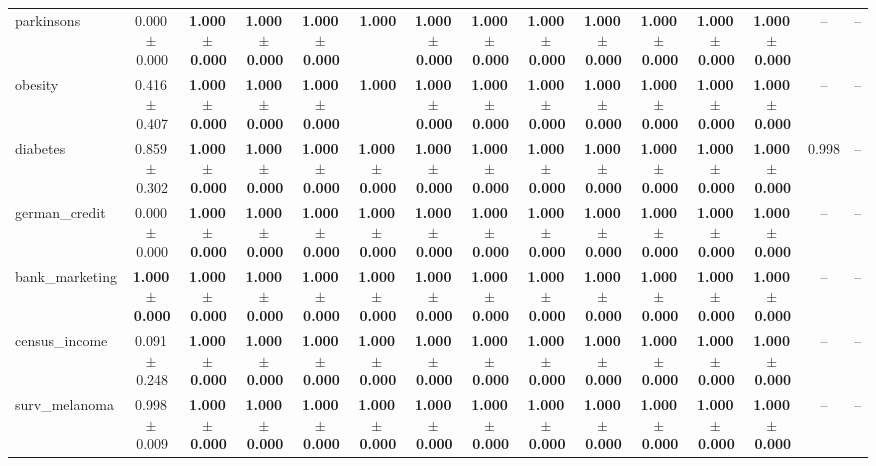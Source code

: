 \documentclass[8pt]{extarticle}
\begin{document}
\begin{longtable}{l*{14}{c}}
parkinsons & 0.000\,$\pm$\,0.000 & \textbf{1.000\,$\pm$\,0.000} & \textbf{1.000\,$\pm$\,0.000} & \textbf{1.000\,$\pm$\,0.000} & \textbf{1.000} & \textbf{1.000\,$\pm$\,0.000} & \textbf{1.000\,$\pm$\,0.000} & \textbf{1.000\,$\pm$\,0.000} & \textbf{1.000\,$\pm$\,0.000} & \textbf{1.000\,$\pm$\,0.000} & \textbf{1.000\,$\pm$\,0.000} & \textbf{1.000\,$\pm$\,0.000} & -- & -- \\
obesity & 0.416\,$\pm$\,0.407 & \textbf{1.000\,$\pm$\,0.000} & \textbf{1.000\,$\pm$\,0.000} & \textbf{1.000\,$\pm$\,0.000} & \textbf{1.000} & \textbf{1.000\,$\pm$\,0.000} & \textbf{1.000\,$\pm$\,0.000} & \textbf{1.000\,$\pm$\,0.000} & \textbf{1.000\,$\pm$\,0.000} & \textbf{1.000\,$\pm$\,0.000} & \textbf{1.000\,$\pm$\,0.000} & \textbf{1.000\,$\pm$\,0.000} & -- & -- \\
diabetes & 0.859\,$\pm$\,0.302 & \textbf{1.000\,$\pm$\,0.000} & \textbf{1.000\,$\pm$\,0.000} & \textbf{1.000\,$\pm$\,0.000} & \textbf{1.000\,$\pm$\,0.000} & \textbf{1.000\,$\pm$\,0.000} & \textbf{1.000\,$\pm$\,0.000} & \textbf{1.000\,$\pm$\,0.000} & \textbf{1.000\,$\pm$\,0.000} & \textbf{1.000\,$\pm$\,0.000} & \textbf{1.000\,$\pm$\,0.000} & \textbf{1.000\,$\pm$\,0.000} & 0.998 & -- \\
german\_credit & 0.000\,$\pm$\,0.000 & \textbf{1.000\,$\pm$\,0.000} & \textbf{1.000\,$\pm$\,0.000} & \textbf{1.000\,$\pm$\,0.000} & \textbf{1.000\,$\pm$\,0.000} & \textbf{1.000\,$\pm$\,0.000} & \textbf{1.000\,$\pm$\,0.000} & \textbf{1.000\,$\pm$\,0.000} & \textbf{1.000\,$\pm$\,0.000} & \textbf{1.000\,$\pm$\,0.000} & \textbf{1.000\,$\pm$\,0.000} & \textbf{1.000\,$\pm$\,0.000} & -- & -- \\
bank\_marketing & \textbf{1.000\,$\pm$\,0.000} & \textbf{1.000\,$\pm$\,0.000} & \textbf{1.000\,$\pm$\,0.000} & \textbf{1.000\,$\pm$\,0.000} & \textbf{1.000\,$\pm$\,0.000} & \textbf{1.000\,$\pm$\,0.000} & \textbf{1.000\,$\pm$\,0.000} & \textbf{1.000\,$\pm$\,0.000} & \textbf{1.000\,$\pm$\,0.000} & \textbf{1.000\,$\pm$\,0.000} & \textbf{1.000\,$\pm$\,0.000} & \textbf{1.000\,$\pm$\,0.000} & -- & -- \\
census\_income & 0.091\,$\pm$\,0.248 & \textbf{1.000\,$\pm$\,0.000} & \textbf{1.000\,$\pm$\,0.000} & \textbf{1.000\,$\pm$\,0.000} & \textbf{1.000\,$\pm$\,0.000} & \textbf{1.000\,$\pm$\,0.000} & \textbf{1.000\,$\pm$\,0.000} & \textbf{1.000\,$\pm$\,0.000} & \textbf{1.000\,$\pm$\,0.000} & \textbf{1.000\,$\pm$\,0.000} & \textbf{1.000\,$\pm$\,0.000} & \textbf{1.000\,$\pm$\,0.000} & -- & -- \\
surv\_melanoma & 0.998\,$\pm$\,0.009 & \textbf{1.000\,$\pm$\,0.000} & \textbf{1.000\,$\pm$\,0.000} & \textbf{1.000\,$\pm$\,0.000} & \textbf{1.000\,$\pm$\,0.000} & \textbf{1.000\,$\pm$\,0.000} & \textbf{1.000\,$\pm$\,0.000} & \textbf{1.000\,$\pm$\,0.000} & \textbf{1.000\,$\pm$\,0.000} & \textbf{1.000\,$\pm$\,0.000} & \textbf{1.000\,$\pm$\,0.000} & \textbf{1.000\,$\pm$\,0.000} & -- & -- \\

\end{longtable}
\end{document}
